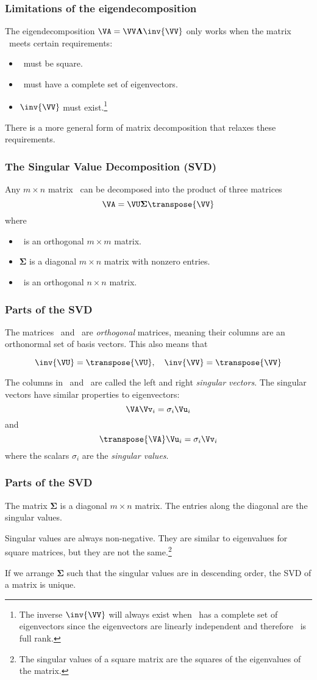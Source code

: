 \documentclass{beamer}
\begin{document}
\begin{frame}
\frametitle{Limitations of the eigendecomposition}

The eigendecomposition $\VA = \VV\boldsymbol{\Lambda}\inv{\VV}$ only works when the matrix \VA\ meets certain requirements:
\begin{itemize}
	\item \VA\ must be square.
	\item \VA\ must have a complete set of eigenvectors.
	\item $\inv{\VV}$ must exist.\footnote{The inverse $\inv{\VV}$ will always exist when \VA\ has a complete set of eigenvectors since the eigenvectors are linearly independent and therefore \VV\ is full rank.}
\end{itemize}

There is a more general form of matrix decomposition that relaxes these requirements.
\end{frame}

\begin{frame}
\frametitle{The Singular Value Decomposition (SVD)}

Any $m\times n$ matrix \VA\ can be decomposed into the product of three matrices
\[ \VA = \VU\boldsymbol{\Sigma}\transpose{\VV} \]
where
\begin{itemize}
	\item \VU\ is an orthogonal $m\times m$ matrix.
	\item $\boldsymbol{\Sigma}$ is a diagonal $m\times n$ matrix with nonzero entries.
	\item \VV\ is an orthogonal $n\times n$ matrix.
\end{itemize}
\end{frame}

\begin{frame}
\frametitle{Parts of the SVD}

The matrices \VU\ and \VV\ are \emph{orthogonal} matrices, meaning their columns are an orthonormal set of basis vectors. This also means that

\[ \inv{\VU} = \transpose{\VU},\quad \inv{\VV} = \transpose{\VV} \]

The columns in \VU\ and \VV\ are called the left and right \emph{singular vectors}. The singular vectors have similar properties to eigenvectors:
\[ \VA\Vv_i = \sigma_i\Vu_i \]
and
\[ \transpose{\VA}\Vu_i = \sigma_i\Vv_i \]
where the scalars $\sigma_i$ are the \emph{singular values}.
\end{frame}

\begin{frame}
\frametitle{Parts of the SVD}

The matrix $\boldsymbol{\Sigma}$ is a diagonal $m\times n$ matrix. The entries along the diagonal are the singular values.

\bigskip
Singular values are always non-negative. They are similar to eigenvalues for square matrices, but they are not the same.\footnote{The singular values of a square matrix are the squares of the eigenvalues of the matrix.}

\bigskip
If we arrange $\boldsymbol{\Sigma}$ such that the singular values are in descending order, the SVD of a matrix is unique.
\end{frame}
\end{document}
